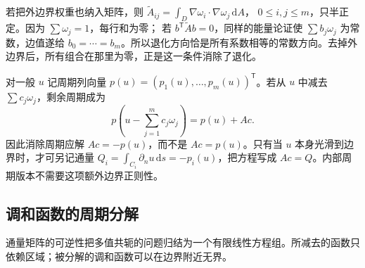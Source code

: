 \ProseParagraphBreak
若把外边界权重也纳入矩阵，则
\(\widetilde A_{ij}=\int_D\nabla\omega_i\cdot\nabla\omega_j\,\mathrm dA\)，
\(0\le i,j\le m\)，只半正定。因为 \(\sum\omega_j=1\)，每行和为零；
若 \(b^{\mathsf T}\widetilde A b=0\)，同样的能量论证使
\(\sum b_j\omega_j\) 为常数，边值遂给 \(b_0=\cdots=b_m\)。所以退化方向恰是所有系数相等的常数方向。去掉外边界后，所有组合在那里为零，正是这一条件消除了退化。

\ProseParagraphBreak
对一般 \(u\) 记周期列向量
\(p(u)=(p_1(u),\ldots,p_m(u))^{\mathsf T}\)。若从 \(u\) 中减去
\(\sum c_j\omega_j\)，剩余周期成为
\[
 p\left(u-\sum_{j=1}^m c_j\omega_j\right)=p(u)+Ac.
\]
因此消除周期应解 \(Ac=-p(u)\)，而不是 \(Ac=p(u)\)。只有当 \(u\) 本身光滑到边界时，才可另记通量
\(Q_i=\int_{C_i}\partial_nu\,\mathrm ds=-p_i(u)\)，把方程写成
\(Ac=Q\)。内部周期版本不需要这项额外边界正则性。

\subsection{调和函数的周期分解}
\label{b3:subsec:170504}

通量矩阵的可逆性把多值共轭的问题归结为一个有限线性方程组。所减去的函数只依赖区域；被分解的调和函数可以在边界附近无界。

